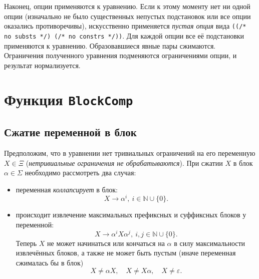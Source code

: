 \documentclass[12pt]{article}
\begin{document}
Наконец, опции применяются к уравнению. Если к этому моменту нет ни одной опции
(изначально не было существенных непустых подстановок или все опции оказались
противоречивы), искусственно применяется \textit{пустая опция} вида
\texttt{((/* no substs */) (/* no constrs */))}. Для каждой опции все её
подстановки применяются к уравнению. Образовавшиеся явные пары сжимаются.
Ограничения полученного уравнения подменяются ограничениями опции, и результат
нормализуется.



\section{Функция \texttt{BlockComp}}


\subsection{Сжатие переменной в блок} \label{block-comp}

Предположим, что в уравнении нет тривиальных ограничений на его переменную $X
\in \Xi$ (\textit{нетривиальные ограничения не обрабатываются}). При сжатии $X$
в блок $\alpha \in \Sigma$ необходимо рассмотреть два случая:
\begin{itemize}
  \item переменная \textit{коллапсирует} в блок:
  \begin{equation} \label{block:collapsed}
    X \to \alpha^i, \ i \in \mathbb{N} \cup \{ 0 \}.
  \end{equation}

  \item происходит извлечение максимальных префиксных и суффиксных блоков у
  переменной:
  \begin{equation} \label{block:extracted}
    X \to \alpha^i X \alpha^j, \ i, j \in \mathbb{N} \cup \{ 0 \}.
  \end{equation}
  Теперь $X$ не может начинаться или кончаться на $\alpha$ в силу
  максимальности извлечённых блоков, а также не может быть пустым (иначе
  переменная сжималась бы в блок)
  \begin{equation} \label{block:constraints}
    X \ne \alpha X, \quad X \ne X \alpha, \quad X \ne \varepsilon.
  \end{equation}
\end{itemize}
\end{document}
